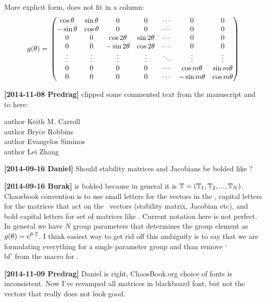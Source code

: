 More explicit form, does not fit in a column:
\[
	 g (\theta)= \\
					  \begin{pmatrix}
					  \cos \theta & \sin \theta & 0               & 0              & \cdots & 0              & 0               \\
					 -\sin \theta & \cos \theta & 0               & 0              & \cdots & 0              & 0               \\
					  0             & 0 		   & \cos 2 \theta & \sin 2 \theta & \cdots & 0              & 0               \\
					  0             & 0            &-\sin 2 \theta & \cos 2 \theta & \cdots & 0              & 0               \\
					  \vdots       & \vdots      & \vdots         & \vdots        & \ddots & \vdots         & \vdots         \\
					  0             & 0 		   & 0               & 0              & \cdots & \cos m \theta & \sin m \theta  \\
					  0             & 0            & 0	             & 0              & \cdots &-\sin m \theta & \cos m \theta
					  \end{pmatrix}
\]


{\bf[2014-11-08 Predrag]} clipped some commented text from the manuscript
and to here:

\noindent
author{ Keith M. Carroll} \\%
author{ Bryce Robbins} \\%
author{ Evangelos Siminos}  \\ %
author{ Lei Zhang} %

{\bf[2014-09-16 Daniel]}
Should stability matrices and Jacobians be bolded like \Lg?

{\bf[2014-09-16 Burak]}
\Lg is bolded because in general it is $\mathbb{T} = (\mathbb{T}_1,
\mathbb{T}_2, ..., \mathbb{T}_N)$. Chaosbook convention is to use small letters for the
vectors in the \statesp , capital letters for the matrices that act on
the \statesp\ vectors (stability matrix, Jacobian etc), and bold capital
letters for set of matrices like \Lg . Current notation here is not
perfect. In general we have $N$ group parameters that determines the
group element as $g({\bf \theta}) = e^{\theta \cdot \mathbb{T}}$. I think easiest way
to get rid off this ambiguity is to say that we are formulating
everything for a single parameter group and than remove `\\bf' from the
macro for \Lg .

{\bf[2014-11-09 Predrag]}
 Daniel is right, ChaosBook.org choice of fonts is inconsistent.
Now I've revamped all matrices in blackboard font, but not the vectors
that really does not look good.
